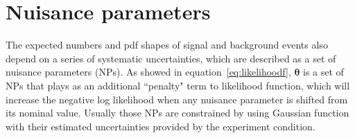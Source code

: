 \section{Nuisance parameters}

The expected numbers and pdf shapes of signal and background events also depend on a series of systematic uncertainties, 
which are described as a set of nuisance parameters (NPs).
As showed in equation~\ref{eq:likelihoodf}, $\pmb{\theta}$ is a set of NPs that plays as an additional ``penalty" term to likelihood function, 
which will increase the negative log likelihood when any nuisance parameter is shifted from its nominal value.
Usually those NPs are constrained by using Gaussian function with their estimated uncertainties provided by the experiment condition.
